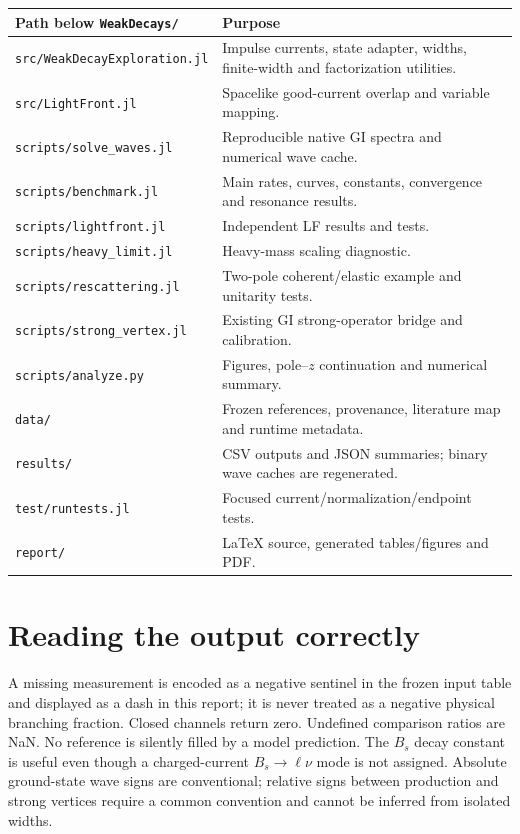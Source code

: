 \documentclass[11pt,a4paper]{article}
\begin{document}
\begin{longtable}{>{\raggedright\arraybackslash}p{.39\linewidth}>{\raggedright\arraybackslash}p{.53\linewidth}}
\toprule Path below \texttt{WeakDecays/} & Purpose \\\midrule
\texttt{src/WeakDecayExploration.jl} & Impulse currents, state adapter, widths, finite-width and factorization utilities.\\
\texttt{src/LightFront.jl} & Spacelike good-current overlap and variable mapping.\\
\texttt{scripts/solve\_waves.jl} & Reproducible native GI spectra and numerical wave cache.\\
\texttt{scripts/benchmark.jl} & Main rates, curves, constants, convergence and resonance results.\\
\texttt{scripts/lightfront.jl} & Independent LF results and tests.\\
\texttt{scripts/heavy\_limit.jl} & Heavy-mass scaling diagnostic.\\
\texttt{scripts/rescattering.jl} & Two-pole coherent/elastic example and unitarity tests.\\
\texttt{scripts/strong\_vertex.jl} & Existing GI strong-operator bridge and calibration.\\
\texttt{scripts/analyze.py} & Figures, pole--$z$ continuation and numerical summary.\\
\texttt{data/} & Frozen references, provenance, literature map and runtime metadata.\\
\texttt{results/} & CSV outputs and JSON summaries; binary wave caches are regenerated.\\
\texttt{test/runtests.jl} & Focused current/normalization/endpoint tests.\\
\texttt{report/} & LaTeX source, generated tables/figures and PDF.\\
\bottomrule
\end{longtable}

\section{Reading the output correctly}
A missing measurement is encoded as a negative sentinel in the frozen input table and displayed as a dash in this report; it is never treated as a negative physical branching fraction. Closed channels return zero. Undefined comparison ratios are NaN. No reference is silently filled by a model prediction. The $B_s$ decay constant is useful even though a charged-current $B_s\to\ell\nu$ mode is not assigned. Absolute ground-state wave signs are conventional; relative signs between production and strong vertices require a common convention and cannot be inferred from isolated widths.
\end{document}
